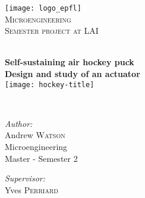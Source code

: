 

\newcommand{\thedate}{\today}
\usepackage[pdftex]{graphicx} 
\usepackage{pdfpages}

\begin{titlepage}
\nocite{*}      %
  \begin{center}
     
     
    \texttt{[image: logo\_epfl]}\\[1.5cm]
     
    \textsc{\LARGE Microengineering }\\[1.0cm]

    \textsc{\Large Semester project at LAI}\\[0.1cm]

    \vfill 
     
    \HRule \\[0.7cm]
    { \huge \bfseries Self-sustaining air hockey puck}\\[0.2cm]
    { \large \bfseries Design and study of an actuator}\\[0.4cm]

    \texttt{[image: hockey-title]} 
     
    \HRule \\[2.0cm]
    
    \begin{minipage}{0.4\textwidth}
      \begin{flushleft} \large
        \emph{Author:} \\
        Andrew \textsc{Watson}\\[0.7cm]

        Microengineering\\
        Master - Semester 2\\[0.5cm]
      \end{flushleft}
    \end{minipage}
    \begin{minipage}{0.4\textwidth}
      \begin{flushright} \large
        \emph{Supervisor:} \\
        Yves \textsc{Perriard}\\[0.7cm]


\end{flushright}
\end{minipage}
\end{center}
\end{titlepage}
